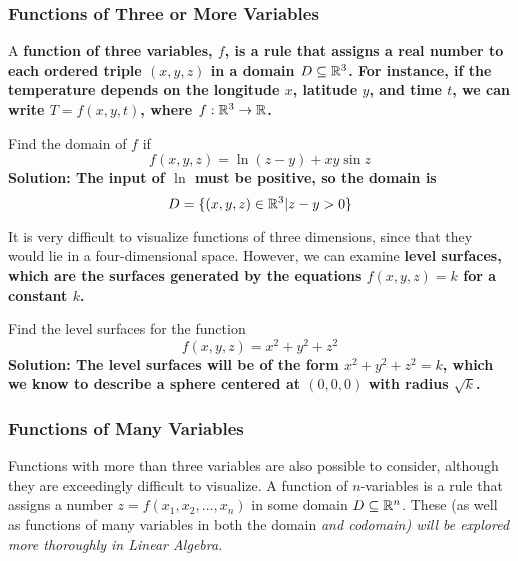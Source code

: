 \subsubsection{Functions of Three or More Variables}
A \bf{function of three variables}, \(f\), is a rule that assigns a real number to each ordered triple \((x,y,z)\) in a domain \(D\subseteq \mathbb{R}^3\). For instance, if the temperature depends on the longitude \(x\), latitude \(y\), and time \(t\), we can write \(T=f(x,y,t)\), where \(f: \mathbb{R}^3\to \mathbb{R}\).
\begin{example}
    Find the domain of \(f\) if 
    \[ f(x,y,z) = \ln(z-y)+xy\sin z\]
    \bf{Solution: }The input of \(\ln\) must be positive, so the domain is
    \[ D = \{(x,y,z)\in\mathbb{R}^3|z-y>0\}\]
\end{example}
It is very difficult to visualize functions of three dimensions, since that they would lie in a four-dimensional space. However, we can examine \bf{level surfaces}, which are the surfaces generated by the equations \(f(x,y,z)=k\) for a constant \(k\). 
\begin{example}
    Find the level surfaces for the function \[ f(x,y,z) = x^2+y^2+z^2 \]
    \bf{Solution: }The level surfaces will be of the form \(x^2+y^2+z^2=k\), which we know to describe a sphere centered at \((0,0,0)\) with radius \(\sqrt k\). 
\end{example}
\subsubsection{Functions of Many Variables}
Functions with more than three variables are also possible to consider, although they are exceedingly difficult to visualize. A function of \(n\)-variables is a rule that assigns a number \(z = f(x_1, x_2, \dots, x_n)\) in some domain \(D\subseteq \mathbb{R}^n\). These (as well as functions of many variables in both the domain \it{and} codomain) will be explored more thoroughly in Linear Algebra.
